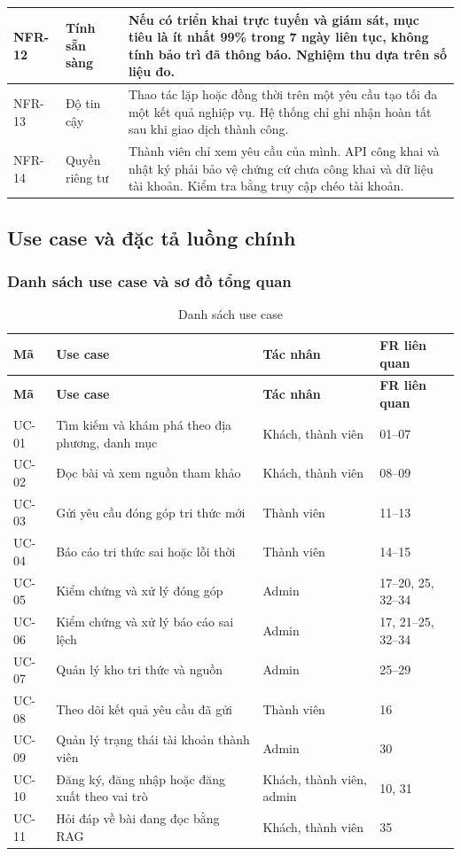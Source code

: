 \begin{longtable}{|L{18mm}|L{27mm}|L{94mm}|}
NFR-12 & Tính sẵn sàng & Nếu có triển khai trực tuyến và giám sát, mục tiêu là ít nhất 99\% trong 7 ngày liên tục, không tính bảo trì đã thông báo. Nghiệm thu dựa trên số liệu đo.\\\hline
NFR-13 & Độ tin cậy & Thao tác lặp hoặc đồng thời trên một yêu cầu tạo tối đa một kết quả nghiệp vụ. Hệ thống chỉ ghi nhận hoàn tất sau khi giao dịch thành công.\\\hline
NFR-14 & Quyền riêng tư & Thành viên chỉ xem yêu cầu của mình. API công khai và nhật ký phải bảo vệ chứng cứ chưa công khai và dữ liệu tài khoản. Kiểm tra bằng truy cập chéo tài khoản.\\\hline
\end{longtable}

\ReportNeedSpace{50mm}
\subsection{Use case và đặc tả luồng chính}
\subsubsection{Danh sách use case và sơ đồ tổng quan}

\begingroup
\setlength{\extrarowheight}{0pt}
\begin{longtable}{|L{17mm}|L{64mm}|L{30mm}|L{23mm}|}
\caption{Danh sách use case}\label{tab:chapter3-usecases}\\\hline
{}\textbf{Mã} & \textbf{Use case} & \textbf{Tác nhân} & \textbf{FR liên quan}\\\hline
\endfirsthead
\hline
{}\textbf{Mã} & \textbf{Use case} & \textbf{Tác nhân} & \textbf{FR liên quan}\\\hline
\endhead
\endfoot
UC-01 & Tìm kiếm và khám phá theo địa phương, danh mục & Khách, thành viên & 01--07\\\hline
UC-02 & Đọc bài và xem nguồn tham khảo & Khách, thành viên & 08--09\\\hline
UC-03 & Gửi yêu cầu đóng góp tri thức mới & Thành viên & 11--13\\\hline
UC-04 & Báo cáo tri thức sai hoặc lỗi thời & Thành viên & 14--15\\\hline
UC-05 & Kiểm chứng và xử lý đóng góp & Admin & 17--20, 25, 32--34\\\hline
UC-06 & Kiểm chứng và xử lý báo cáo sai lệch & Admin & 17, 21--25, 32--34\\\hline
UC-07 & Quản lý kho tri thức và nguồn & Admin & 25--29\\\hline
UC-08 & Theo dõi kết quả yêu cầu đã gửi & Thành viên & 16\\\hline
UC-09 & Quản lý trạng thái tài khoản thành viên & Admin & 30\\\hline
UC-10 & Đăng ký, đăng nhập hoặc đăng xuất theo vai trò & Khách, thành viên, admin & 10, 31\\\hline
UC-11 & Hỏi đáp về bài đang đọc bằng RAG & Khách, thành viên & 35\\\hline
\end{longtable}
\endgroup

